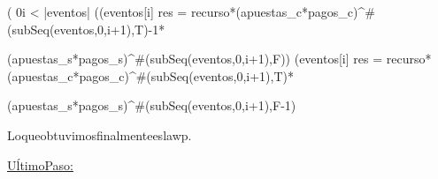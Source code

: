 \equiv ( 0\leq i < |eventos| \wedge ((eventos[i] \wedge res = recurso*(apuestas_c*pagos_c)^{\#(subSeq(eventos,0,i+1),T)-1}*
\vspace{0.2cm}

(apuestas_s*pagos_s)^{\#(subSeq(eventos,0,i+1),F)}) \vee (\neg eventos[i] \wedge  res = recurso*(apuestas_c*pagos_c)^{\#(subSeq(eventos,0,i+1),T)}*
\vspace{0.2cm}

(apuestas_s*pagos_s)^{\#(subSeq(eventos,0,i+1),F-1)}
\vspace{0.4cm}

Lo\hspace{3}que\hspace{3}obtuvimos\hspace{3}finalmente\hspace{3}es\hspace{3}la\hspace{3}wp.
\vspace{0.2cm}

\underline{U\'ltimoPaso:}

